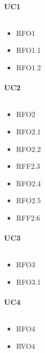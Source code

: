\paragraph{UC1}
$\medspace$
\begin{multicols}{3}
    \begin{itemize}
        \item RFO1
        \item RFO1.1
        \item RFO1.2
    \end{itemize}
\end{multicols}

\paragraph{UC2}
$\medspace$
\begin{multicols}{3}
    \begin{itemize}
        \item RFO2
        \item RFO2.1
        \item RFO2.2
        \item RFF2.3
        \item RFO2.4
        \item RFO2.5
        \item RFF2.6
    \end{itemize}
\end{multicols}

\paragraph{UC3}
$\medspace$
\begin{multicols}{3}
    \begin{itemize}
        \item RFO3
        \item RFO3.1
    \end{itemize}
\end{multicols}

\paragraph{UC4}
$\medspace$
\begin{multicols}{3}
    \begin{itemize}
        \item RFO4
        \item RVO4
    \end{itemize}
\end{multicols}

